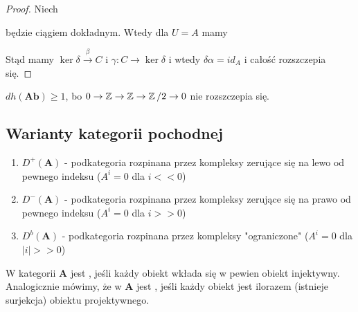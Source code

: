 \begin{proof}
  Niech  będzie ciągiem dokładnym. Wtedy dla $U=A$ mamy
  \begin{center}\end{center}
  Stąd mamy $\ker \delta\xrightarrow{\beta} C$ i $\gamma:C\to \ker\delta$ i wtedy $\delta\alpha=id_A$ i całość rozszczepia się.
\end{proof}

\begin{conclusion}
  $dh(\mathbf{Ab})\geq 1$, bo $0\to \operatorname{\mathbb{Z}}\to \operatorname{\mathbb{Z}}\to \operatorname{\mathbb{Z}}/2\to 0$ nie rozszczepia się.
\end{conclusion}

\subsection{Warianty kategorii pochodnej}

\begin{enumerate}
  \item $D^+(\mathbf{A})$ - podkategoria rozpinana przez kompleksy zerujące się na lewo od pewnego indeksu ($A^i=0$ dla $i<<0$)
  \item $D^-(\mathbf{A})$ - podkategoria rozpinana przez kompleksy zerujące się na prawo od pewnego indeksu ($A^i=0$ dla $i>>0$)
  \item $D^b(\mathbf{A})$ - podkategoria rozpinana przez kompleksy "ograniczone" ($A^i=0$ dla $|i|>>0$)
\end{enumerate}

\begin{definition}
  W kategorii $\mathbf{A}$ jest , jeśli każdy obiekt wkłada się w pewien obiekt injektywny. Analogicznie mówimy, że w $\mathbf{A}$ jest , jeśli każdy obiekt jest ilorazem (istnieje surjekcja) obiektu projektywnego.
\end{definition}

